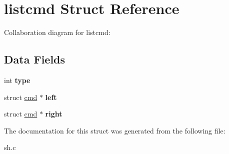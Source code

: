 \hypertarget{structlistcmd}{}\section{listcmd Struct Reference}
\label{structlistcmd}


Collaboration diagram for listcmd\+:
\subsection*{Data Fields}
\begin{DoxyCompactItemize}
\item 
int {\bfseries type}\hypertarget{structlistcmd_a2db395eea2aa2323b521cd272c6ccc23}{}\label{structlistcmd_a2db395eea2aa2323b521cd272c6ccc23}

\item 
struct \hyperlink{structcmd}{cmd} $\ast$ {\bfseries left}\hypertarget{structlistcmd_a3058dfa06817a015f821d38f1e1edc3b}{}\label{structlistcmd_a3058dfa06817a015f821d38f1e1edc3b}

\item 
struct \hyperlink{structcmd}{cmd} $\ast$ {\bfseries right}\hypertarget{structlistcmd_a063a3a59362ddfafb7c0e4c848d4e8c5}{}\label{structlistcmd_a063a3a59362ddfafb7c0e4c848d4e8c5}

\end{DoxyCompactItemize}


The documentation for this struct was generated from the following file\+:\begin{DoxyCompactItemize}
\item 
sh.\+c\end{DoxyCompactItemize}
